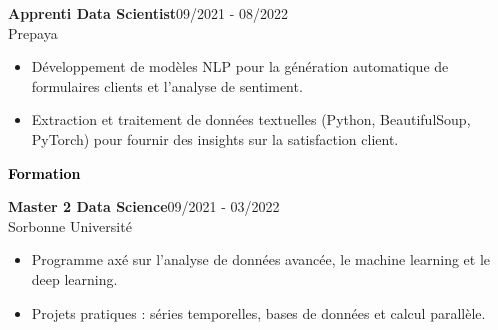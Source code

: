 \documentclass{article}
\begin{document}
\begin{paracol}{2}
\vspace{3mm}

\colorbox{maincolor}{%
  \begin{minipage}{\linewidth}
    \noindent
    \textbf{Apprenti Data Scientist}\hfill 09/2021 - 08/2022\\
    Prepaya\\[-0.3em]
    \begin{itemize}[leftmargin=*]
      \item Développement de modèles NLP pour la génération automatique de formulaires clients et l’analyse de sentiment. \item Extraction et traitement de données textuelles (Python, BeautifulSoup, PyTorch) pour fournir des insights sur la satisfaction client.
    \end{itemize}
  \end{minipage}}   %

\vspace{8mm}

\textcolor{black}{\Large \textbf{Formation}} \\[2pt]
\colorbox{maincolor}{%
  \begin{minipage}{\linewidth}
    \noindent
    \textbf{Master 2 Data Science}\hfill 09/2021 - 03/2022\\
    Sorbonne Université\\[-0.3em]
    \begin{itemize}[leftmargin=*]
      \item Programme axé sur l’analyse de données avancée, le machine learning et le deep learning. \item Projets pratiques : séries temporelles, bases de données et calcul parallèle.
    \end{itemize}
  \end{minipage}}       %

\end{paracol}
\end{document}
